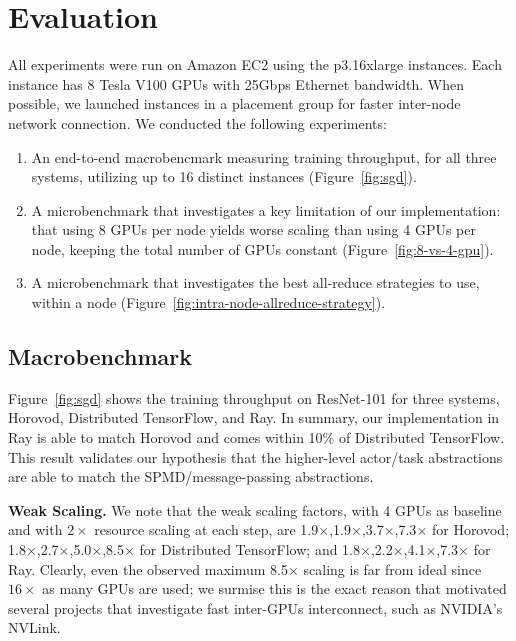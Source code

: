 \section{Evaluation}
All experiments were run on Amazon EC2 using the p3.16xlarge instances.  Each instance has 8 Tesla V100 GPUs with 25Gbps Ethernet bandwidth.  When possible, we launched instances in a placement group for faster inter-node network connection.  We conducted the following experiments:

\begin{enumerate}
    \item An end-to-end macrobencmark measuring training throughput, for all three systems, utilizing up to 16 distinct instances (Figure~\ref{fig:sgd}).
    \item A microbenchmark that investigates a key limitation of our implementation: that using 8 GPUs per node yields worse scaling than using 4 GPUs per node, keeping the total number of GPUs constant (Figure~\ref{fig:8-vs-4-gpu}).
    \item A microbenchmark that investigates the best all-reduce strategies to use, within a node (Figure~\ref{fig:intra-node-allreduce-strategy}).
\end{enumerate}


\subsection{Macrobenchmark}
Figure~\ref{fig:sgd} shows the training throughput on ResNet-101 for three systems, Horovod, Distributed TensorFlow, and Ray.  In summary, our implementation in Ray is able to match Horovod and comes within 10\% of Distributed TensorFlow.  This result validates our hypothesis that the higher-level actor/task abstractions are able to match the SPMD/message-passing abstractions.

{\bf Weak Scaling.}  We note that the weak scaling factors, with 4 GPUs as baseline and with $2\times$ resource scaling at each step, are 1.9$\times$,1.9$\times$,3.7$\times$,7.3$\times$ for Horovod;
1.8$\times$,2.7$\times$,5.0$\times$,8.5$\times$ for Distributed TensorFlow;
and
1.8$\times$,2.2$\times$,4.1$\times$,7.3$\times$ for Ray.  Clearly, even the observed maximum 8.5$\times$ scaling  is far from ideal since $16\times$ as many GPUs are used; we surmise this is the exact reason that motivated several projects that investigate fast inter-GPUs interconnect, such as  NVIDIA's NVLink.

